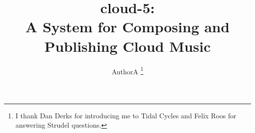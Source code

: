 \documentclass[runningheads,a4paper]{llncs}
\begin{document}
\mainmatter  %

\title{cloud-5:\\A System for Composing and Publishing Cloud Music}




\author{AuthorA \thanks{I thank Dan Derks for introducing me to Tidal Cycles and Felix Roos for answering Strudel questions.}}
%


%
%
\end{document}
